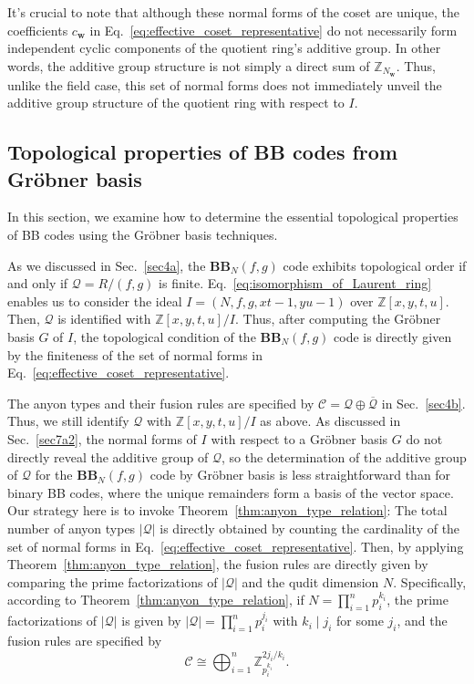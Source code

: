 \documentclass[aps,prb,english,superscriptaddress,twocolumn,tightenlines,showpacs,longbibliography,floatfix,amsfonts]{revtex4-2}
\begin{document}
It's crucial to note that although these normal forms of the coset are unique, the coefficients $c_{\mathbf{w}}$ in Eq.~\eqref{eq:effective_coset_representative} do not necessarily form independent cyclic components of the quotient ring's additive group. In other words, the additive group structure is not simply a direct sum of $\mathbb{Z}_{N_{\mathbf{w}}}$. Thus, unlike the field case, this set of normal forms does not immediately unveil the additive group structure of the quotient ring with respect to $I$.
\subsection{Topological properties of BB codes from Gr\"{o}bner basis}
In this section, we examine how to determine the essential topological properties of BB codes using the Gr\"{o}bner basis techniques.

As we discussed in Sec.~\ref{sec4a}, the $\mathbf{BB}_N(f,g)$ code exhibits topological order if and only if $\mathcal{Q}=R/(f,g)$ is finite. Eq.~\eqref{eq:isomorphism_of_Laurent_ring} enables us to consider the ideal $I=(N,f,g,xt-1,yu-1)$ over $\mathbb{Z}[x,y,t,u]$. Then, $\mathcal{Q}$ is identified with $\mathbb{Z}[x,y,t,u]/I$. Thus, after computing the Gr\"{o}bner basis $G$ of $I$, the topological condition of the $\mathbf{BB}_N(f,g)$ code is directly given by the finiteness of the set of normal forms in Eq.~\eqref{eq:effective_coset_representative}.
  
The anyon types and their fusion rules are specified by $\mathcal{C}=\mathcal{Q}\oplus\overline{\mathcal{Q}}$ in Sec.~\ref{sec4b}. Thus, we still identify $\mathcal{Q}$ with $\mathbb{Z}[x,y,t,u]/I$ as above. As discussed in Sec.~\ref{sec7a2}, the normal forms of $I$ with respect to a Gr\"{o}bner basis $G$ do not directly reveal the additive group of $\mathcal{Q}$, so the determination of the additive group of $\mathcal{Q}$ for the $\mathbf{BB}_N(f,g)$ code by Gr\"{o}bner basis is less straightforward than for binary BB codes, where the unique remainders form a basis of the vector space. Our strategy here is to invoke Theorem~\ref{thm:anyon_type_relation}: The total number of anyon types $|\mathcal{Q}|$ is directly obtained by counting the cardinality of the set of normal forms in Eq.~\eqref{eq:effective_coset_representative}. Then, by applying Theorem~\ref{thm:anyon_type_relation}, the fusion rules are directly given by comparing the prime factorizations of $|\mathcal{Q}|$ and the qudit dimension $N$. Specifically, according to Theorem~\ref{thm:anyon_type_relation}, if $N=\prod_{i=1}^{n}p_i^{k_i}$, the prime factorizations of $|\mathcal{Q}|$ is given by $|\mathcal{Q}|=\prod_{i=1}^{n}p_i^{j_i}$ with $k_i\mid j_i$ for some $j_i$, and the fusion rules are specified by
\begin{equation}
    \mathcal{C}\cong\bigoplus_{i=1}^n\mathbb{Z}_{p_i^{k_i}}^{2j_i/k_i}.
\end{equation}
\end{document}
